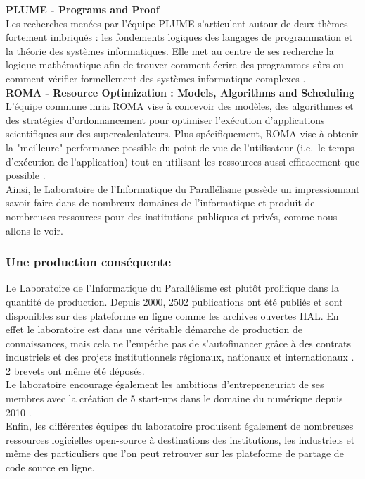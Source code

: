 \textbf{PLUME - Programs and Proof}\\
Les recherches menées par l'équipe PLUME s'articulent autour de deux thèmes fortement imbriqués : les fondements logiques des langages de programmation et la théorie des systèmes informatiques. Elle met au centre de ses recherche la logique mathématique afin de trouver comment écrire des programmes sûrs ou comment vérifier formellement des systèmes informatique complexes \cite{plume}.\\

\textbf{ROMA - Resource Optimization : Models, Algorithms and Scheduling}\\
L'équipe commune \gls{inria} ROMA vise à concevoir des modèles, des algorithmes et des stratégies d'ordonnancement pour optimiser l'exécution d'applications scientifiques sur des supercalculateurs. Plus spécifiquement, ROMA vise à obtenir la "meilleure" performance possible du point de vue de l'utilisateur (i.e.\ le temps d'exécution de l'application) tout en utilisant les ressources aussi efficacement que possible \cite{roma}.\\

Ainsi, le Laboratoire de l'Informatique du Parallélisme possède un impressionnant savoir faire dans de nombreux domaines de l'informatique et produit de nombreuses ressources pour des institutions publiques et privés, comme nous allons le voir.

\subsubsection{Une production conséquente}
Le Laboratoire de l'Informatique du Parallélisme est plutôt prolifique dans la quantité de production. Depuis 2000, 2502 publications ont été publiés et sont disponibles sur des plateforme en ligne comme les archives ouvertes HAL. En effet le laboratoire est dans une véritable démarche de production de connaissances, mais cela ne l'empêche pas de s'autofinancer grâce à des contrats industriels et des projets institutionnels régionaux, nationaux et internationaux \cite{reportHCERES}. 2 brevets ont même été déposés.\\

Le laboratoire encourage également les ambitions d'entrepreneuriat de ses membres avec la création de 5 start-ups dans le domaine du numérique depuis 2010 \cite{presUCBL}.\\

Enfin, les différentes équipes du laboratoire produisent également de nombreuses ressources logicielles open-source à destinations des institutions, les industriels et même des particuliers que l'on peut retrouver sur les plateforme de partage de code source en ligne.